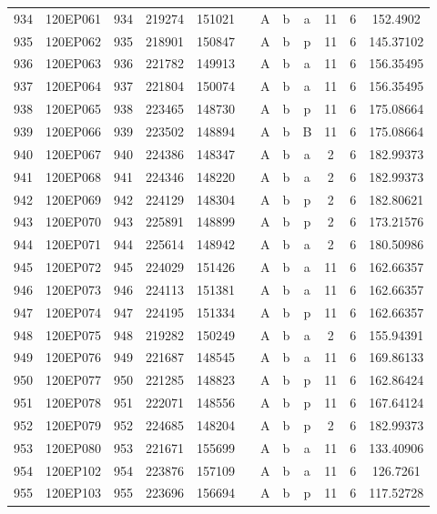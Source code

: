 \begin{tabular}{|*{12}{c|}}
934 & 120EP061 & 934 & 219274 & 151021 &  & A & b & a & 11 & 6 & 152.4902 \\ 
935 & 120EP062 & 935 & 218901 & 150847 &  & A & b & p & 11 & 6 & 145.37102 \\ 
936 & 120EP063 & 936 & 221782 & 149913 &  & A & b & a & 11 & 6 & 156.35495 \\ 
937 & 120EP064 & 937 & 221804 & 150074 &  & A & b & a & 11 & 6 & 156.35495 \\ 
938 & 120EP065 & 938 & 223465 & 148730 &  & A & b & p & 11 & 6 & 175.08664 \\ 
939 & 120EP066 & 939 & 223502 & 148894 &  & A & b & B & 11 & 6 & 175.08664 \\ 
940 & 120EP067 & 940 & 224386 & 148347 &  & A & b & a & 2 & 6 & 182.99373 \\ 
941 & 120EP068 & 941 & 224346 & 148220 &  & A & b & a & 2 & 6 & 182.99373 \\ 
942 & 120EP069 & 942 & 224129 & 148304 &  & A & b & p & 2 & 6 & 182.80621 \\ 
943 & 120EP070 & 943 & 225891 & 148899 &  & A & b & p & 2 & 6 & 173.21576 \\ 
944 & 120EP071 & 944 & 225614 & 148942 &  & A & b & a & 2 & 6 & 180.50986 \\ 
945 & 120EP072 & 945 & 224029 & 151426 &  & A & b & a & 11 & 6 & 162.66357 \\ 
946 & 120EP073 & 946 & 224113 & 151381 &  & A & b & a & 11 & 6 & 162.66357 \\ 
947 & 120EP074 & 947 & 224195 & 151334 &  & A & b & p & 11 & 6 & 162.66357 \\ 
948 & 120EP075 & 948 & 219282 & 150249 &  & A & b & a & 2 & 6 & 155.94391 \\ 
949 & 120EP076 & 949 & 221687 & 148545 &  & A & b & a & 11 & 6 & 169.86133 \\ 
950 & 120EP077 & 950 & 221285 & 148823 &  & A & b & p & 11 & 6 & 162.86424 \\ 
951 & 120EP078 & 951 & 222071 & 148556 &  & A & b & p & 11 & 6 & 167.64124 \\ 
952 & 120EP079 & 952 & 224685 & 148204 &  & A & b & p & 2 & 6 & 182.99373 \\ 
953 & 120EP080 & 953 & 221671 & 155699 &  & A & b & a & 11 & 6 & 133.40906 \\ 
954 & 120EP102 & 954 & 223876 & 157109 &  & A & b & a & 11 & 6 & 126.7261 \\ 
955 & 120EP103 & 955 & 223696 & 156694 &  & A & b & p & 11 & 6 & 117.52728 \\ 

\end{tabular}
